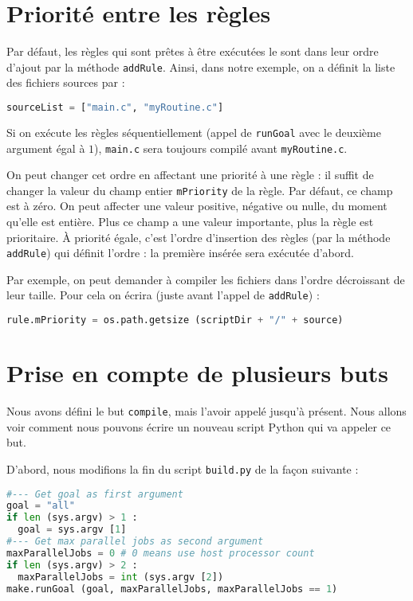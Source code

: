 \documentclass[a4paper,12pt,obeyspaces,openany]{extarticle}
\begin{document}
\section{Priorité entre les règles}

Par défaut, les règles qui sont prêtes à être exécutées le sont dans leur ordre d'ajout par la méthode \texttt{addRule}. Ainsi, dans notre exemple, on a définit la liste des fichiers sources par :
\begin{lstlisting}[language=py]
sourceList = ["main.c", "myRoutine.c"]
\end{lstlisting}
Si on exécute les règles séquentiellement (appel de \texttt{runGoal} avec le deuxième argument égal à $1$), \texttt{main.c} sera toujours compilé avant \texttt{myRoutine.c}.

On peut changer cet ordre en affectant une priorité à une règle : il suffit de changer la valeur du champ entier \texttt{mPriority} de la règle. Par défaut, ce champ est à zéro. On peut affecter une valeur positive, négative ou nulle, du moment qu'elle est entière. Plus ce champ a une valeur importante, plus la règle est prioritaire. À priorité égale, c'est l'ordre d'insertion des règles (par la méthode \texttt{addRule}) qui définit l'ordre : la première insérée sera exécutée d'abord.

Par exemple, on peut demander à compiler les fichiers dans l'ordre décroissant de leur taille. Pour cela on écrira (juste avant l'appel de \texttt{addRule}) :
\begin{lstlisting}[language=py]
  rule.mPriority = os.path.getsize (scriptDir + "/" + source)
\end{lstlisting}







\section{Prise en compte de plusieurs buts}

Nous avons défini le but \texttt{compile}, mais l'avoir appelé jusqu'à présent. Nous allons voir comment nous pouvons écrire un nouveau script Python qui va appeler ce but.

D'abord, nous modifions la fin du script \texttt{build.py} de la façon suivante :
\begin{lstlisting}[language=py]
#--- Get goal as first argument
goal = "all"
if len (sys.argv) > 1 :
  goal = sys.argv [1]
#--- Get max parallel jobs as second argument
maxParallelJobs = 0 # 0 means use host processor count
if len (sys.argv) > 2 :
  maxParallelJobs = int (sys.argv [2])
make.runGoal (goal, maxParallelJobs, maxParallelJobs == 1)
\end{lstlisting}
\end{document}
